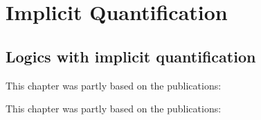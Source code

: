 \documentclass[11pt,a4paper,twoside]{book}
\newcommand\blankpage{%
    \null
    \thispagestyle{empty}%
    \addtocounter{page}{-1}%
    \newpage}
\begin{document}
    \printglossary[title=List of Abbreviations and Glossary] %

	


\mainmatter


 
\label{intro}





\chapter{Implicit Quantification}\label{problem}\label{semantics}

% 
 

\section{Logics with implicit quantification}



\newpage
This chapter was partly based on the publications:
\vspace{0.3cm}


\vspace{0.3cm}







\newpage
This chapter was partly based on the publications:
\vspace{0.5cm}
\end{document}
